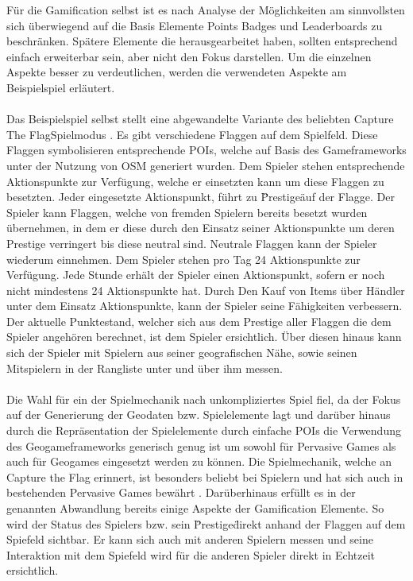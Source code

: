Für die Gamification selbst ist es nach Analyse der Möglichkeiten am sinnvollsten sich überwiegend auf die Basis Elemente Points Badges und Leaderboards zu beschränken. Spätere Elemente die \textcite{Zichermann.2011} herausgearbeitet haben, sollten entsprechend einfach erweiterbar sein, aber nicht den Fokus darstellen. Um die einzelnen Aspekte besser zu verdeutlichen, werden die verwendeten Aspekte am Beispielspiel erläutert.
\\\\
Das Beispielspiel selbst stellt eine abgewandelte Variante des beliebten Capture The FlagSpielmodus \cite{Atkin.1999}.
Es gibt verschiedene Flaggen auf dem Spielfeld. Diese Flaggen symbolisieren entsprechende POIs, welche auf Basis des Gameframeworks unter der Nutzung von OSM generiert wurden. Dem Spieler stehen entsprechende Aktionspunkte zur Verfügung, welche er einsetzten kann um diese Flaggen zu besetzten. Jeder eingesetzte Aktionspunkt, führt zu \"Prestige\" auf der Flagge. Der Spieler kann Flaggen, welche von fremden Spielern bereits besetzt wurden übernehmen, in dem er diese durch den Einsatz seiner Aktionspunkte um deren Prestige verringert bis diese neutral sind. Neutrale Flaggen kann der Spieler wiederum einnehmen. Dem Spieler stehen pro Tag 24 Aktionspunkte zur Verfügung. Jede Stunde erhält der Spieler einen Aktionspunkt, sofern er noch nicht mindestens 24 Aktionspunkte hat. Durch Den Kauf von Items über Händler unter dem Einsatz Aktionspunkte, kann der Spieler seine Fähigkeiten verbessern. Der aktuelle Punktestand, welcher sich aus dem Prestige aller Flaggen die dem Spieler angehören berechnet, ist dem Spieler ersichtlich. Über diesen hinaus kann sich der Spieler mit Spielern aus seiner geografischen Nähe, sowie seinen Mitspielern in der Rangliste unter und über ihm messen.
\\\\
Die Wahl für ein der Spielmechanik nach unkompliziertes Spiel fiel, da der Fokus auf der Generierung der Geodaten bzw. Spielelemente lagt und darüber hinaus durch die Repräsentation der Spielelemente durch einfache POIs die Verwendung des Geogameframeworks generisch genug ist um sowohl für Pervasive Games als auch für Geogames eingesetzt werden zu können. Die Spielmechanik, welche an Capture the Flag erinnert, ist besonders beliebt bei Spielern und hat sich auch in bestehenden Pervasive Games bewährt \cite{Bell.2006,Ingress.2014}. Darüberhinaus erfüllt es in der genannten Abwandlung bereits einige Aspekte der Gamification Elemente. So wird der Status des Spielers bzw. sein \"Prestige\" direkt anhand der Flaggen auf dem Spiefeld sichtbar. Er kann sich auch mit anderen Spielern messen und seine Interaktion mit dem Spiefeld wird für die anderen Spieler direkt in Echtzeit ersichtlich.

